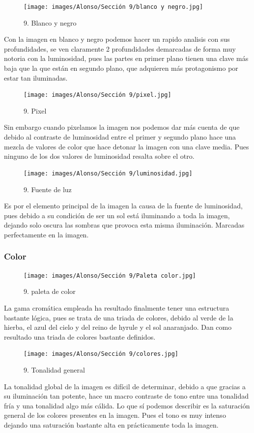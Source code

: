 \documentclass[12pt]{article}
\begin{document}
    \begin{figure}[H]
      \centering
      \texttt{[image: images/Alonso/Sección 9/blanco y negro.jpg]}
      \caption{\small 9. Blanco y negro}
    \end{figure}
    Con la imagen en blanco y negro podemos hacer un rapido analisis con sus profundidades, se ven claramente 2 profundidades demarcadas de forma muy notoria con la luminosidad, pues las partes en primer plano tienen una clave más baja que la que están en segundo plano, que adquieren más protagonismo por estar tan iluminadas.

    \begin{figure}[H]
      \centering
      \texttt{[image: images/Alonso/Sección 9/pixel.jpg]}
      \caption{\small 9. Pixel}
    \end{figure}

    Sin embargo cuando pixelamos la imagen nos podemos dar más cuenta de que debido al contraste de luminosidad entre el primer y segundo plano hace una mezcla de valores de color que hace detonar la imagen con una clave media. Pues ninguno de los dos valores de luminosidad resalta sobre el otro.

    \begin{figure}[H]
      \centering
      \texttt{[image: images/Alonso/Sección 9/luminosidad.jpg]}
      \caption{\small 9. Fuente de luz}
    \end{figure}

    Es por el elemento principal de la imagen la causa de la fuente de luminosidad, pues debido a su condición de ser un sol está iluminando a toda la imagen, dejando solo oscura las sombras que provoca esta misma iluminación. Marcadas perfectamente en la imagen.

        \subsubsection{Color}
        \begin{figure}[H]
      \centering
      \texttt{[image: images/Alonso/Sección 9/Paleta color.jpg]}
      \caption{\small 9. paleta de color}
    \end{figure}

        La gama cromática empleada ha resultado finalmente tener una estructura bastante lógica, pues se trata de una triada de colores, debido al verde de la hierba, el azul del cielo y del reino de hyrule y el sol anaranjado. Dan como resultado una triada de colores bastante definidos.
\begin{figure}[H]
      \centering
      \texttt{[image: images/Alonso/Sección 9/colores.jpg]}
      \caption{\small 9. Tonalidad general}
    \end{figure}
    La tonalidad global de la imagen es difícil de determinar, debido a que gracias a su iluminación tan potente, hace un macro contraste de tono entre una tonalidad fría y una tonalidad algo más cálida. Lo que sí podemos describir es la saturación general de los colores presentes en la imagen. Pues el tono es muy intenso dejando una saturación  bastante alta en prácticamente toda la imagen.
\end{document}
